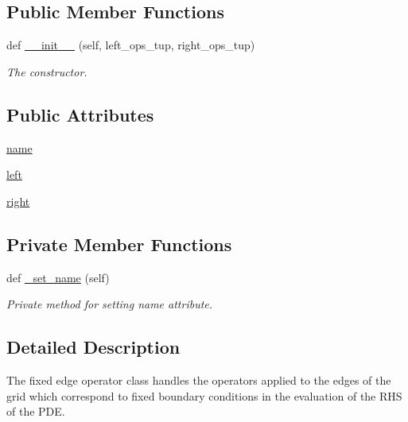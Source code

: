 \subsection*{Public Member Functions}
\begin{DoxyCompactItemize}
\item 
def \hyperlink{classMain__PDE__Repo_1_1src_1_1fixed__edge__ops_1_1FixedEdgeOps_a10e78a05dd1fdb424be03fa98c2ddb01}{\+\_\+\+\_\+init\+\_\+\+\_\+} (self, left\+\_\+ops\+\_\+tup, right\+\_\+ops\+\_\+tup)
\begin{DoxyCompactList}\small\item\em The constructor. \end{DoxyCompactList}\end{DoxyCompactItemize}
\subsection*{Public Attributes}
\begin{DoxyCompactItemize}
\item 
\hyperlink{classMain__PDE__Repo_1_1src_1_1fixed__edge__ops_1_1FixedEdgeOps_a91399d66e3712e6a1a2dd991d3d26e9e}{name}
\item 
\hyperlink{classMain__PDE__Repo_1_1src_1_1fixed__edge__ops_1_1FixedEdgeOps_a3297adebb84dd9e74cd5effe428a9bde}{left}
\item 
\hyperlink{classMain__PDE__Repo_1_1src_1_1fixed__edge__ops_1_1FixedEdgeOps_aea006d7915a600521621a4bb3c89f45b}{right}
\end{DoxyCompactItemize}
\subsection*{Private Member Functions}
\begin{DoxyCompactItemize}
\item 
def \hyperlink{classMain__PDE__Repo_1_1src_1_1fixed__edge__ops_1_1FixedEdgeOps_a15597526848fef9dfa96ea8e6c41c4f2}{\+\_\+set\+\_\+name} (self)
\begin{DoxyCompactList}\small\item\em Private method for setting name attribute. \end{DoxyCompactList}\end{DoxyCompactItemize}


\subsection{Detailed Description}
The fixed edge operator class handles the operators applied to the edges of the grid which correspond to fixed boundary conditions in the evaluation of the R\+HS of the P\+DE. 


